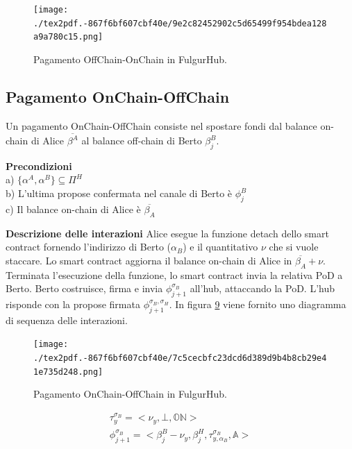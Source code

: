 \documentclass[12pt,italian,]{book}
\begin{document}
\begin{figure}
\centering
\texttt{[image: ./tex2pdf.-867f6bf607cbf40e/9e2c82452902c5d65499f954bdea128a9a780c15.png]}
\caption{\protect\hypertarget{caso-duso-offchain-onchain}{}{}Pagamento OffChain-OnChain in FulgurHub.}
\end{figure}

\hypertarget{pagamento-onchain-offchain}{%
\subsection{Pagamento OnChain-OffChain}\label{pagamento-onchain-offchain}}

Un pagamento OnChain-OffChain consiste nel spostare fondi dal balance on-chain di Alice \(\overline{\beta^A}\) al balance off-chain di Berto \(\beta^B_j\).

\textbf{\textbf{Precondizioni}}\\
a) \(\{\alpha^A, \alpha^B\} \subseteq \Pi^H\)\\
b) L'ultima propose confermata nel canale di Berto è \(\phi^B_j\)\\
c) Il balance on-chain di Alice è \(\overline{\beta_A}\)

\textbf{\textbf{Descrizione delle interazioni}} Alice esegue la funzione detach dello smart contract fornendo l'indirizzo di Berto (\(\alpha_B\)) e il quantitativo \(\nu\) che si vuole staccare. Lo smart contract aggiorna il balance on-chain di Alice in \(\overline{\beta_A}+\nu\). Terminata l'esecuzione della funzione, lo smart contract invia la relativa PoD a Berto. Berto costruisce, firma e invia \(\phi^{\sigma_B}_{j+1}\) all'hub, attaccando la PoD. L'hub risponde con la propose firmata \(\phi^{\sigma_B,\sigma_H}_{j+1}\). In figura \protect\hyperlink{caso-duso-onchain-offchain}{9} viene fornito uno diagramma di sequenza delle interazioni.

\begin{figure}
\centering
\texttt{[image: ./tex2pdf.-867f6bf607cbf40e/7c5cecbfc23dcd6d389d9b4b8cb29e41e735d248.png]}
\caption{\protect\hypertarget{caso-duso-onchain-offchain}{}{}Pagamento OnChain-OffChain in FulgurHub.}
\end{figure}

\begin{equation}
\begin{aligned}
\label{Propose detach pagamento OnChain-OffChain}
\tau^{\sigma_B}_y =  <\nu_y, \bot, \mathbb{ON}> \\
\phi^{\sigma_B}_{j+1} = <\beta^B_j-\nu_y, \beta^H_j, \tau^{\sigma_B}_{y, \alpha_B} ,\mathbb{A}>
\end{aligned}
\end{equation}
\end{document}
